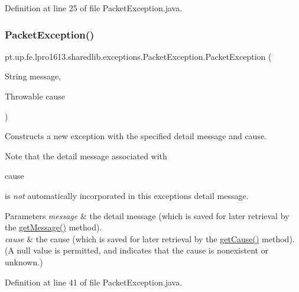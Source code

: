 Definition at line 25 of file Packet\+Exception.\+java.

\hypertarget{classpt_1_1up_1_1fe_1_1lpro1613_1_1sharedlib_1_1exceptions_1_1_packet_exception_aabf4cbacec06473f617c9b8d23829640}{}\label{classpt_1_1up_1_1fe_1_1lpro1613_1_1sharedlib_1_1exceptions_1_1_packet_exception_aabf4cbacec06473f617c9b8d23829640} 
\subsubsection{\texorpdfstring{Packet\+Exception()}{PacketException()}\hspace{0.1cm}{\footnotesize\ttfamily [3/4]}}
{\footnotesize\ttfamily pt.\+up.\+fe.\+lpro1613.\+sharedlib.\+exceptions.\+Packet\+Exception.\+Packet\+Exception (\begin{DoxyParamCaption}\item[{String}]{message,  }\item[{Throwable}]{cause }\end{DoxyParamCaption})}

Constructs a new exception with the specified detail message and cause. 

Note that the detail message associated with
\begin{DoxyCode}
cause 
\end{DoxyCode}
 is {\itshape not} automatically incorporated in this exception\textquotesingle{}s detail message.


\begin{DoxyParams}{Parameters}
{\em message} & the detail message (which is saved for later retrieval by the \hyperlink{}{get\+Message()} method). \\
\hline
{\em cause} & the cause (which is saved for later retrieval by the \hyperlink{}{get\+Cause()} method). (A {\ttfamily null} value is permitted, and indicates that the cause is nonexistent or unknown.) \\
\hline
\end{DoxyParams}


Definition at line 41 of file Packet\+Exception.\+java.

\hypertarget{classpt_1_1up_1_1fe_1_1lpro1613_1_1sharedlib_1_1exceptions_1_1_packet_exception_ad29eb9640b76bd84e41d523a135b9d88}{}\label{classpt_1_1up_1_1fe_1_1lpro1613_1_1sharedlib_1_1exceptions_1_1_packet_exception_ad29eb9640b76bd84e41d523a135b9d88} 
